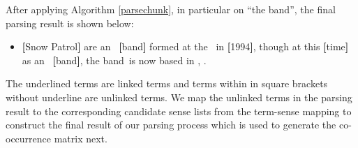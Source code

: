After applying Algorithm \ref{parsechunk}, in particular on
``the band'', the final parsing result is shown below:
\begin{itemize}
\item {\textbf{[}Snow Patrol\textbf{]}} are an
\rbb\ {\textbf{[}band\textbf{]}} formed at the \rbb\ in
{\textbf{[}1994\textbf{]}}, though at this {\textbf{[}time\textbf{]}} as an
\rbb\ {\textbf{[}band\textbf{]}}, the
\lbb band\rbb\ is now based in \rbb,
\rbb.
\end{itemize}

The underlined terms are linked terms and terms within
in square brackets without underline are unlinked terms.
We map the unlinked terms in the parsing result to
the corresponding candidate sense lists
from the term-sense mapping to construct the final result
of our parsing process which is used to generate the
co-occurrence matrix next.


